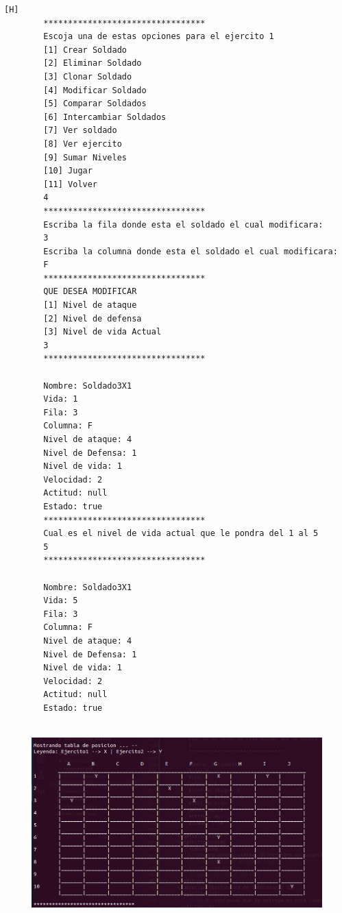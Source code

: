 \documentclass{article}
\begin{document}
	\begin{lstlisting}[language=bash,caption={Ejecucion:}][H]
		*********************************
		Escoja una de estas opciones para el ejercito 1
		[1] Crear Soldado
		[2] Eliminar Soldado
		[3] Clonar Soldado
		[4] Modificar Soldado
		[5] Comparar Soldados
		[6] Intercambiar Soldados
		[7] Ver soldado
		[8] Ver ejercito
		[9] Sumar Niveles
		[10] Jugar
		[11] Volver
		4
		*********************************
		Escriba la fila donde esta el soldado el cual modificara:
		3
		Escriba la columna donde esta el soldado el cual modificara:
		F
		*********************************
		QUE DESEA MODIFICAR
		[1] Nivel de ataque
		[2] Nivel de defensa
		[3] Nivel de vida Actual
		3
		*********************************
		
		Nombre: Soldado3X1
		Vida: 1
		Fila: 3
		Columna: F
		Nivel de ataque: 4
		Nivel de Defensa: 1
		Nivel de vida: 1
		Velocidad: 2
		Actitud: null
		Estado: true
		*********************************
		Cual es el nivel de vida actual que le pondra del 1 al 5 
		5
		*********************************
		
		Nombre: Soldado3X1
		Vida: 5
		Fila: 3
		Columna: F
		Nivel de ataque: 4
		Nivel de Defensa: 1
		Nivel de vida: 1
		Velocidad: 2
		Actitud: null
		Estado: true
				
	\end{lstlisting}
	\begin{figure}[H]
		\centering
		\includegraphics[width=1.0\textwidth,keepaspectratio]{img/Commit7.2.png}
	\end{figure}
\end{document}
